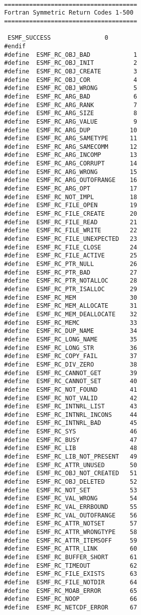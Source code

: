  \begin{verbatim}
 
 =====================================
 Fortran Symmetric Return Codes 1-500
 =====================================
 
  ESMF_SUCCESS               0
 #endif
 #define  ESMF_RC_OBJ_BAD            1
 #define  ESMF_RC_OBJ_INIT           2
 #define  ESMF_RC_OBJ_CREATE         3
 #define  ESMF_RC_OBJ_COR            4
 #define  ESMF_RC_OBJ_WRONG          5
 #define  ESMF_RC_ARG_BAD            6
 #define  ESMF_RC_ARG_RANK           7
 #define  ESMF_RC_ARG_SIZE           8
 #define  ESMF_RC_ARG_VALUE          9
 #define  ESMF_RC_ARG_DUP           10
 #define  ESMF_RC_ARG_SAMETYPE      11
 #define  ESMF_RC_ARG_SAMECOMM      12
 #define  ESMF_RC_ARG_INCOMP        13
 #define  ESMF_RC_ARG_CORRUPT       14
 #define  ESMF_RC_ARG_WRONG         15
 #define  ESMF_RC_ARG_OUTOFRANGE    16
 #define  ESMF_RC_ARG_OPT           17
 #define  ESMF_RC_NOT_IMPL          18
 #define  ESMF_RC_FILE_OPEN         19
 #define  ESMF_RC_FILE_CREATE       20
 #define  ESMF_RC_FILE_READ         21
 #define  ESMF_RC_FILE_WRITE        22
 #define  ESMF_RC_FILE_UNEXPECTED   23
 #define  ESMF_RC_FILE_CLOSE        24
 #define  ESMF_RC_FILE_ACTIVE       25
 #define  ESMF_RC_PTR_NULL          26
 #define  ESMF_RC_PTR_BAD           27
 #define  ESMF_RC_PTR_NOTALLOC      28
 #define  ESMF_RC_PTR_ISALLOC       29
 #define  ESMF_RC_MEM               30
 #define  ESMF_RC_MEM_ALLOCATE      31
 #define  ESMF_RC_MEM_DEALLOCATE    32
 #define  ESMF_RC_MEMC              33
 #define  ESMF_RC_DUP_NAME          34
 #define  ESMF_RC_LONG_NAME         35
 #define  ESMF_RC_LONG_STR          36
 #define  ESMF_RC_COPY_FAIL         37
 #define  ESMF_RC_DIV_ZERO          38
 #define  ESMF_RC_CANNOT_GET        39
 #define  ESMF_RC_CANNOT_SET        40
 #define  ESMF_RC_NOT_FOUND         41
 #define  ESMF_RC_NOT_VALID         42
 #define  ESMF_RC_INTNRL_LIST       43
 #define  ESMF_RC_INTNRL_INCONS     44
 #define  ESMF_RC_INTNRL_BAD        45
 #define  ESMF_RC_SYS               46
 #define  ESMF_RC_BUSY              47
 #define  ESMF_RC_LIB               48
 #define  ESMF_RC_LIB_NOT_PRESENT   49
 #define  ESMF_RC_ATTR_UNUSED       50
 #define  ESMF_RC_OBJ_NOT_CREATED   51
 #define  ESMF_RC_OBJ_DELETED       52
 #define  ESMF_RC_NOT_SET           53
 #define  ESMF_RC_VAL_WRONG         54
 #define  ESMF_RC_VAL_ERRBOUND      55
 #define  ESMF_RC_VAL_OUTOFRANGE    56
 #define  ESMF_RC_ATTR_NOTSET       57
 #define  ESMF_RC_ATTR_WRONGTYPE    58
 #define  ESMF_RC_ATTR_ITEMSOFF     59
 #define  ESMF_RC_ATTR_LINK         60
 #define  ESMF_RC_BUFFER_SHORT      61
 #define  ESMF_RC_TIMEOUT           62
 #define  ESMF_RC_FILE_EXISTS       63
 #define  ESMF_RC_FILE_NOTDIR       64
 #define  ESMF_RC_MOAB_ERROR        65
 #define  ESMF_RC_NOOP              66
 #define  ESMF_RC_NETCDF_ERROR      67
 

\end{verbatim}
